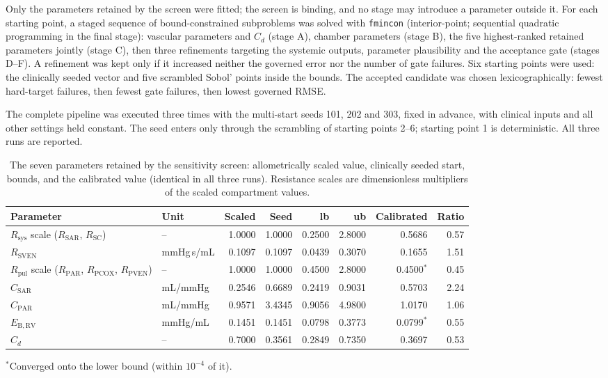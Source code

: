 Only the parameters retained by the screen were fitted; the screen is binding, and no stage may introduce a parameter outside it. For each starting point, a staged sequence of bound-constrained subproblems was solved with \texttt{fmincon} (interior-point; sequential quadratic programming in the final stage): vascular parameters and $C_d$ (stage A), chamber parameters (stage B), the five highest-ranked retained parameters jointly (stage C), then three refinements targeting the systemic outputs, parameter plausibility and the acceptance gate (stages D--F). A refinement was kept only if it increased neither the governed error nor the number of gate failures. Six starting points were used: the clinically seeded vector and five scrambled Sobol' points inside the bounds. The accepted candidate was chosen lexicographically: fewest hard-target failures, then fewest gate failures, then lowest governed RMSE.

The complete pipeline was executed three times with the multi-start seeds 101, 202 and 303, fixed in advance, with clinical inputs and all other settings held constant. The seed enters only through the scrambling of starting points 2--6; starting point 1 is deterministic. All three runs are reported.

\begin{table}[ht]
\centering\small
\caption{The seven parameters retained by the sensitivity screen: allometrically scaled value, clinically seeded start, bounds, and the calibrated value (identical in all three runs). Resistance scales are dimensionless multipliers of the scaled compartment values.}
\label{tab:bounds}
\begin{tabular}{llrrrrrr}
\toprule
\textbf{Parameter} & \textbf{Unit} & \textbf{Scaled} & \textbf{Seed} & \textbf{lb} & \textbf{ub} & \textbf{Calibrated} & \textbf{Ratio} \\
\midrule
$R_{\mathrm{sys}}$ scale ($R_{\mathrm{SAR}}$, $R_{\mathrm{SC}}$) & -- & 1.0000 & 1.0000 & 0.2500 & 2.8000 & 0.5686 & 0.57 \\
$R_{\mathrm{SVEN}}$ & mmHg\,s/mL & 0.1097 & 0.1097 & 0.0439 & 0.3070 & 0.1655 & 1.51 \\
$R_{\mathrm{pul}}$ scale ($R_{\mathrm{PAR}}$, $R_{\mathrm{PCOX}}$, $R_{\mathrm{PVEN}}$) & -- & 1.0000 & 1.0000 & 0.4500 & 2.8000 & 0.4500$^{\ast}$ & 0.45 \\
$C_{\mathrm{SAR}}$ & mL/mmHg & 0.2546 & 0.6689 & 0.2419 & 0.9031 & 0.5703 & 2.24 \\
$C_{\mathrm{PAR}}$ & mL/mmHg & 0.9571 & 3.4345 & 0.9056 & 4.9800 & 1.0170 & 1.06 \\
$E_{\mathrm{B,RV}}$ & mmHg/mL & 0.1451 & 0.1451 & 0.0798 & 0.3773 & 0.0799$^{\ast}$ & 0.55 \\
$C_d$ & -- & 0.7000 & 0.3561 & 0.2849 & 0.7350 & 0.3697 & 0.53 \\
\bottomrule
\end{tabular}
\par\vspace{2pt}
\footnotesize{$^{\ast}$Converged onto the lower bound (within $10^{-4}$ of it).}
\end{table}

